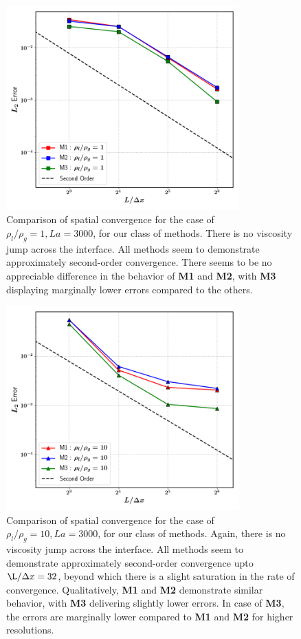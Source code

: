 \begin{figure}[h!]
    \centering
    \includegraphics[width = 0.8\textwidth]{plots/capwave/conv_r1.png}
	\caption{Comparison of spatial convergence for the case of $\rho_l/\rho_g = 1 , La = 3000$, for our class of methods. There is no viscosity jump across the interface. All methods seem to demonstrate approximately second-order convergence. There seems to be no appreciable difference in the behavior of \textbf{M1} and \textbf{M2}, with \textbf{M3} displaying marginally lower errors compared to the others. }
    \label{conv_r1}
\end{figure}


\begin{figure}[h!]
    \centering
    \includegraphics[width = 0.8\textwidth]{plots/capwave/conv_r10.png}
	\caption{Comparison of spatial convergence for the case of $\rho_l/\rho_g = 10 , La = 3000$, for our class of methods. Again, there is no viscosity jump across the interface. All methods seem to demonstrate approximately second-order convergence upto $\L/ \Delta x = 32 $, beyond which there is a slight saturation in the rate of convergence. Qualitatively, \textbf{M1} and \textbf{M2} demonstrate similar behavior, with \textbf{M3} delivering slightly lower errors. In case of \textbf{M3}, the errors are marginally lower compared to \textbf{M1} and \textbf{M2} for higher resolutions. }
    \label{conv_r10}
\end{figure}


